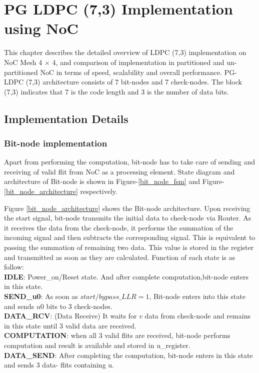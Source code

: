 \chapter{PG LDPC (7,3) Implementation using NoC}
\label{chapter7}
This chapter describes the detailed overview of LDPC (7,3) implementation on NoC Mesh 4 $\times$ 4, and comparison of implementation in partitioned and un-partitioned NoC in terms of speed, scalability and overall performance. 
PG-LDPC (7,3) architecture consists of 7 bit-nodes and 7 check-nodes. The block (7,3) indicates
that 7 is the code length and 3 is the number of data bits. 

\section{Implementation Details}

\subsection{Bit-node implementation}
Apart from performing the computation, bit-node has to take care of sending and 
receiving of valid flit from NoC as a processing element.
State diagram and architecture of Bit-node is shown in Figure-\ref{bit_node_fsm}
and Figure-\ref{bit_node_architecture} respectively. 

 Figure \ref{bit_node_architecture} shows the Bit-node architecture. Upon receiving the start signal, bit-node transmits the initial data to check-node via Router. As it receives the data from the check-node, it performs the summation of the incoming signal and then subtracts the corresponding signal. This is equivalent to passing the summation of remaining two data. This value is stored in the register and transmitted as soon as they are calculated. Function of each state is as follow:\\
 \textbf{IDLE}: Power\_on/Reset state. And after complete computation,bit-node enters in this state.\\
 \textbf{SEND\_u0}: As soon as $start/bypass\_LLR= 1$, Bit-node enters into this state and sends $u0$ bits to 3 check-nodes.\\  
 \textbf{DATA\_RCV}: (Data Receive) It waits for $v$ data from check-node and remains in this state until $3$ valid data are received.\\
 \textbf{COMPUTATION}: when all 3 valid flits are received, bit-node performs computation and result is available and stored in u\_register.\\
 \textbf{DATA\_SEND}: After completing the computation, bit-node enters in this state and sends 3 data- flits containing u.\\   
 
